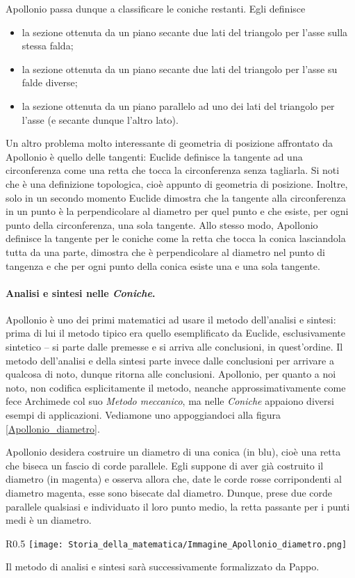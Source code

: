 \par Apollonio passa dunque a classificare le coniche restanti. Egli definisce
\begin{itemize}
	\item {} la sezione ottenuta da un piano secante due lati del triangolo per l'asse sulla stessa falda;
	\item {} la sezione ottenuta da un piano secante due lati del triangolo per l'asse su falde diverse;
	\item {} la sezione ottenuta da un piano parallelo ad uno dei lati del triangolo per l'asse (e secante dunque l'altro lato).
\end{itemize}
\par Un altro problema molto interessante di geometria di posizione affrontato da Apollonio \`e quello delle tangenti: Euclide definisce la tangente ad una circonferenza come una retta che tocca la circonferenza senza tagliarla. Si noti che \`e una definizione topologica, cio\`e appunto di geometria di posizione. Inoltre, solo in un secondo momento Euclide dimostra che la tangente alla circonferenza in un punto \`e la perpendicolare al diametro per quel punto e che esiste, per ogni punto della circonferenza, una sola tangente. Allo stesso modo, Apollonio definisce la tangente per le coniche come la retta che tocca la conica lasciandola tutta da una parte, dimostra che \`e perpendicolare al diametro nel punto di tangenza e che per ogni punto della conica esiste una e una sola tangente.
\paragraph{Analisi e sintesi nelle \textit{Coniche}.} Apollonio \`e uno dei primi matematici ad usare il metodo dell'analisi e sintesi: prima di lui il metodo tipico era quello esemplificato da Euclide, esclusivamente sintetico -- si parte dalle premesse e si arriva alle conclusioni, in quest'ordine. Il metodo dell'analisi e della sintesi parte invece dalle conclusioni per arrivare a qualcosa di noto, dunque ritorna alle conclusioni. Apollonio, per quanto a noi noto, non codifica esplicitamente il metodo, neanche approssimativamente come fece Archimede col suo \textit{Metodo meccanico}, ma nelle \textit{Coniche} appaiono diversi esempi di applicazioni. Vediamone uno appoggiandoci alla figura \ref{Apollonio_diametro}.
\par Apollonio desidera costruire un diametro di una conica (in blu), cio\`e una retta che biseca un fascio di corde parallele. Egli suppone di aver gi\`a costruito il diametro (in magenta) e osserva allora che, date le corde rosse corripondenti al diametro magenta, esse sono bisecate dal diametro. Dunque, prese due corde parallele qualsiasi e individuato il loro punto medio, la retta passante per i punti medi \`e un diametro.
\begin{wrapfigure}{R}{0.5\textwidth}
	\texttt{[image: Storia\_della\_matematica/Immagine\_Apollonio\_diametro.png]}
	\caption{Costruzione di un diametro.}
	\label{Apollonio_diametro}
\end{wrapfigure}
\par Il metodo di analisi e sintesi sar\`a successivamente formalizzato da Pappo.
